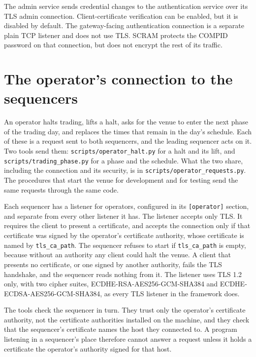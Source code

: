 The admin service sends credential changes to the authentication service over
its TLS admin connection. Client-certificate verification can be enabled, but
it is disabled by default. The gateway-facing authentication connection is a
separate plain TCP listener and does not use TLS. SCRAM protects the COMPID
password on that connection, but does not encrypt the rest of its traffic.

\section{The operator's connection to the sequencers}
\label{sec:security:operator_connection}

An operator halts trading, lifts a halt, asks for the venue to enter the
next phase of the trading day, and replaces the times that remain in the day's
schedule. Each of these is a request sent to both sequencers, and the leading
sequencer acts on it. Two tools send them:
\texttt{scripts/operator\_halt.py} for a halt and its lift, and
\texttt{scripts/trading\_phase.py} for a phase and the schedule. What the two share, including
the connection and its security, is in \texttt{scripts/operator\_requests.py}.
The procedures that start the venue for development and for testing send the
same requests through the same code.

Each sequencer has a listener for operators, configured in its
\texttt{[operator]} section, and separate from every other listener it has. The
listener accepts only TLS. It requires the client to present a certificate, and
accepts the connection only if that certificate was signed by the operator's
certificate authority, whose certificate is named by
\texttt{tls\_ca\_path}. The sequencer refuses to start if
\texttt{tls\_ca\_path} is empty, because without an authority any client could
halt the venue. A client that presents no certificate, or one signed by another
authority, fails the TLS handshake, and the sequencer reads nothing from it. The
listener uses TLS 1.2 only, with two cipher suites, ECDHE-RSA-AES256-GCM-SHA384
and ECDHE-ECDSA-AES256-GCM-SHA384, as every TLS listener in the framework does.

The tools check the sequencer in turn. They trust only the operator's
certificate authority, not the certificate authorities installed on the machine,
and they check that the sequencer's certificate names the host they connected
to. A program listening in a sequencer's place therefore cannot answer a request
unless it holds a certificate the operator's authority signed for that host.

